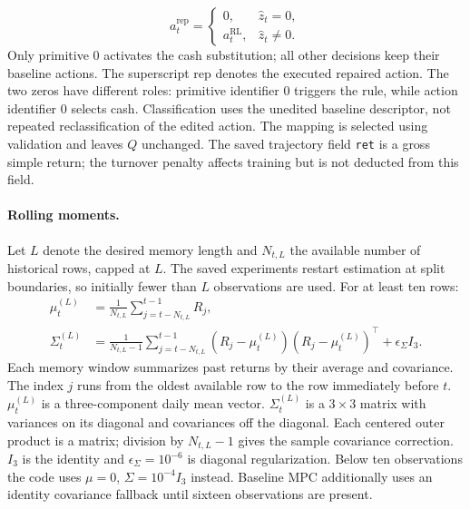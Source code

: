 \begin{equation}
a_t^{\mathrm{rep}}=
\begin{cases}
0,&\hat z_t=0,\\
a_t^{\mathrm{RL}},&\hat z_t\ne0.
\end{cases}
\label{eq:repair-detailed}
\end{equation}
Only primitive 0 activates the cash substitution; all other decisions keep their baseline actions.
The superscript $\mathrm{rep}$ denotes the executed repaired action. The two zeros have different roles: primitive identifier 0 triggers the rule, while action identifier 0 selects cash. Classification uses the unedited baseline descriptor, not repeated reclassification of the edited action. The mapping is selected using validation and leaves $Q$ unchanged. The saved trajectory field \texttt{ret} is a gross simple return; the turnover penalty affects training but is not deducted from this field.

\paragraph{Rolling moments.}
Let $L$ denote the desired memory length and $N_{t,L}$ the available number of historical rows, capped at $L$. The saved experiments restart estimation at split boundaries, so initially fewer than $L$ observations are used. For at least ten rows:
\begin{equation}
\begin{aligned}
\mu_t^{(L)}&=\frac{1}{N_{t,L}}\sum_{j=t-N_{t,L}}^{t-1}R_j,\\
\Sigma_t^{(L)}&=\frac{1}{N_{t,L}-1}\sum_{j=t-N_{t,L}}^{t-1}
(R_j-\mu_t^{(L)})(R_j-\mu_t^{(L)})^\top+\epsilon_\Sigma I_3.
\end{aligned}
\label{eq:mpc-estimates-detailed}
\end{equation}
Each memory window summarizes past returns by their average and covariance.
The index $j$ runs from the oldest available row to the row immediately before $t$. $\mu_t^{(L)}$ is a three-component daily mean vector. $\Sigma_t^{(L)}$ is a $3\times3$ matrix with variances on its diagonal and covariances off the diagonal. Each centered outer product is a matrix; division by $N_{t,L}-1$ gives the sample covariance correction. $I_3$ is the identity and $\epsilon_\Sigma=10^{-6}$ is diagonal regularization. Below ten observations the code uses $\mu=0$, $\Sigma=10^{-4}I_3$ instead. Baseline MPC additionally uses an identity covariance fallback until sixteen observations are present.

